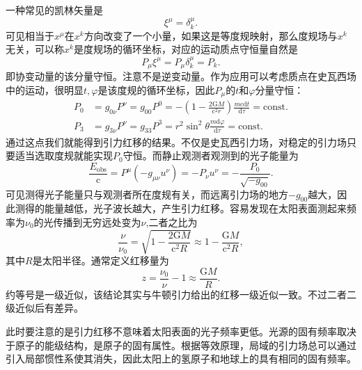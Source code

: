 \documentclass[11pt, a4paper, oneside, onecolumn]{ctexart}
\numberwithin{equation}{subsection}
\begin{document}
一种常见的凯林矢量是
\begin{equation}
\xi^{\mu}=\delta{}^{\mu}_{k}.
\end{equation}
可见相当于$x^{\mu}$在$x^{k}$方向改变了一个小量，如果这是等度规映射，那么度规场与$x^{k}$无关，可以称$x^{k}$是度规场的循环坐标，对应的运动质点守恒量自然是
\begin{equation}
P_{\mu}\xi^{\mu}=P_{\mu}\delta{}^{\mu}_{k}=P_{k}.
\end{equation}
即协变动量的该分量守恒。注意不是逆变动量。作为应用可以考虑质点在史瓦西场中的运动，很明显$t,\varphi$是该度规的循环坐标，因此$P_{\mu}$的$t$和$\varphi$分量守恒：
\begin{align}
P_{0}&=g_{0\nu}P^{\nu}=g_{00}P^{0}=-\left(1-\frac{2\mathrm{G}M}{\mathrm{c}^{2}r}\right)\frac{m\mathrm{c}\mathrm{d}t}{\mathrm{d}\tau}=\text{const}.\\
P_{3}&=g_{3\nu}P^{\nu}=g_{33}P^{3}=r^{2}\sin^{2}\theta\frac{m\mathrm{d}\varphi}{\mathrm{d}\tau}=\text{const}.
\end{align}
通过这点我们就能得到引力红移的结果。不仅是史瓦西引力场，对稳定的引力场只要适当选取度规就能实现$P_{0}$守恒。而静止观测者观测到的光子能量为
\begin{equation}
\frac{E_{\text{obs}}}{\mathrm{c}}=P^{\mu}\left(-g_{\mu\nu}u^{\nu}\right)=-P_{\nu}u^{\nu}=-\frac{P_{0}}{\sqrt{-g_{00}}}.
\end{equation}
可见测得光子能量只与观测者所在度规有关，而远离引力场的地方$-g_{00}$越大，因此测得的能量越低，光子波长越大，产生引力红移。容易发现在太阳表面测起来频率为$\nu_{0}$的光传播到无穷远处变为$\nu$,二者之比为
\begin{equation}
\frac{\nu}{\nu_{0}}=\sqrt{1-\frac{2\mathrm{G}M}{\mathrm{c}^{2}R}}\approx1-\frac{\mathrm{G}M}{\mathrm{c}^{2}R},
\end{equation}
其中$R$是太阳半径。通常定义红移量为
\begin{equation}
z=\frac{\nu_{0}}{\nu}-1\approx\frac{\mathrm{G}M}{R}.
\end{equation}
约等号是一级近似，该结论其实与牛顿引力给出的红移一级近似一致。不过二者二级近似后有差异。

此时要注意的是引力红移不意味着太阳表面的光子频率更低。光源的固有频率取决于原子的能级结构，是原子的固有属性。根据等效原理，局域的引力场总可以通过引入局部惯性系使其消失，因此太阳上的氢原子和地球上的具有相同的固有频率。
\end{document}
